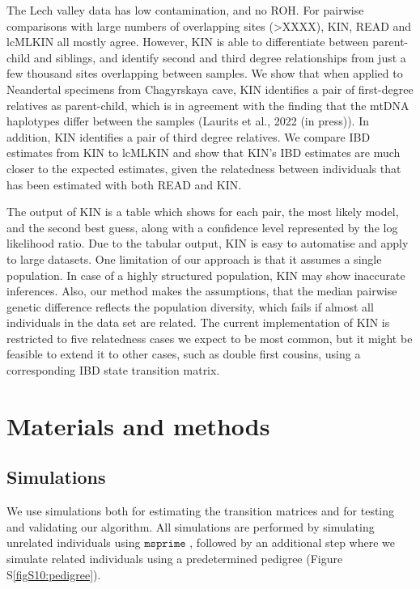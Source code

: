 \documentclass[12pt, letterpaper]{article}
\begin{document}
The Lech valley data  has low contamination, and no ROH. For pairwise comparisons with large numbers of overlapping sites (>XXXX), KIN, READ and lcMLKIN all mostly agree. However, KIN is able to differentiate between parent-child and siblings, and identify second and third degree relationships from just a few thousand sites overlapping between samples. We show that when applied to Neandertal specimens from Chagyrskaya cave, KIN identifies a pair of first-degree relatives as parent-child, which is in agreement with the finding that the mtDNA haplotypes differ between the samples (Laurits et al., 2022 (in press)). In addition, KIN identifies a pair of third degree relatives. We compare IBD estimates from KIN to lcMLKIN and show that KIN's IBD estimates are much closer to the expected estimates, given the relatedness between individuals that has been estimated with both READ and KIN. 

The output of KIN is a table which shows for each pair, the most likely model, and the second best guess, along with a confidence level represented by the log likelihood ratio. Due to the tabular output, KIN is easy to automatise and apply to large datasets. 
One limitation of our approach is that it assumes a single population. In case of a highly structured population, KIN may show inaccurate inferences. Also, our method makes the assumptions, that the median pairwise genetic difference reflects the population diversity, which fails if almost all individuals in the data set are related. The current implementation of KIN is restricted to five relatedness cases we expect to be most common, but it might be feasible to extend it to other cases, such as double first cousins, using a corresponding IBD state transition matrix.


\section{Materials and methods}\label{method}

\subsection{Simulations}\label{simulat}
We use simulations both for estimating the transition matrices and for testing and validating our algorithm. All simulations are performed by simulating unrelated individuals using $\texttt{msprime}$ \cite{kelleher_efficient_2016}, followed by an additional step where we simulate related individuals using a predetermined pedigree (Figure S\ref{figS10:pedigree}).
\end{document}
